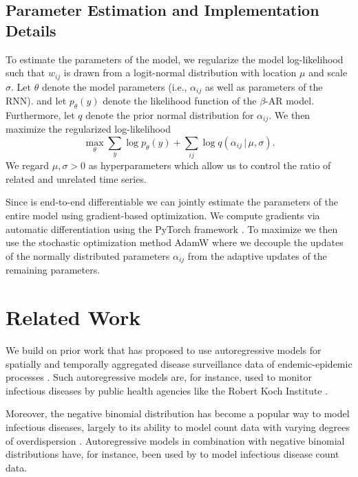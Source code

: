\documentclass{article}
\newcommand{\bAR}{\ensuremath{\beta}\text{-AR}\xspace}
\begin{document}
\subsection{Parameter Estimation and Implementation Details}
\label{sec:org751d6db}
To estimate the parameters of the model, we regularize the
model log-likelihood such that \(w_{ij}\) is drawn from a logit-normal
distribution with location \(\mu\) and scale \(\sigma\). Let \(\theta\) denote
the model parameters (i.e., \(\alpha_{ij}\) as well as parameters of the RNN).
and let \(p_\theta(y)\) denote the likelihood function of the \(\bAR\)
model. Furthermore, let \(q\) denote the prior normal
distribution for \(\alpha_{ij}\). We then maximize the regularized log-likelihood
\begin{equation}
\max_{\theta}\sum_y\log p_\theta(y) + \sum_{ij} \log q(\alpha_{ij}\,|\,\mu,\sigma). \label{eq:objective}
\end{equation}
We regard \(\mu, \sigma > 0\) as hyperparameters which allow us to control the
ratio of related and unrelated time series.

Since  is end-to-end differentiable we can jointly estimate the
parameters of the entire model using gradient-based optimization. We compute
gradients via automatic differentiation using the PyTorch framework
\citep{paszke2019pytorch}. To maximize  we then use the stochastic
optimization method AdamW \citep{loshchilov2018decoupled} where we decouple the
updates of the normally distributed parameters \(\alpha_{ij}\) from the adaptive
updates of the remaining parameters.



\section{Related Work}
\label{sec:org3676b8c}
We build on prior work that has proposed to use autoregressive models
for spatially and temporally aggregated disease surveillance data of endemic-epidemic
processes \citep{held2005statistical,meyer2014powerlaw,meyer2016socialcontact}.
Such autoregressive models are, for instance, used to monitor infectious
diseases by public health agencies like the Robert Koch Institute
\citep{salmon2016surveillance}.

Moreover, the negative binomial distribution has become a popular way to model
infectious diseases, largely to its ability to model count data with varying degrees
of overdispersion \citep{lloyd_smith2007negativebinomial}. Autoregressive models
in combination with negative binomial distributions have, for instance, been
used by \citet{bauer2018stratified,wakefield2019spatio,held2005statistical} to
model infectious disease count data.
\end{document}
